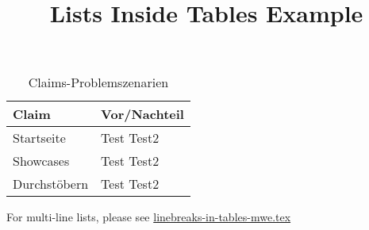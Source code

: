 \documentclass[11pt,a4paper]{scrartcl}
\title{Lists Inside Tables Example}
\begin{document}
\makeatletter
{\LARGE \textbf{\@title}}
\makeatother
\vspace{2.5em}


\begin{table}[ht]\centering
    \begin{tabular}{ll}
        Claim           & Vor/Nachteil                      \\\midrule
        Startseite      & \tabitem{} Test \tabitem{} Test2  \\\addlinespace
        Showcases       & \tabitem{} Test \tabitem{} Test2  \\\addlinespace
        Durchstöbern    & \tabitem{} Test \tabitem{} Test2  \\
    \end{tabular}
    \caption{Claims-Problemszenarien}\label{tab:claims-problemszenarien}
\end{table}

For multi-line lists, please see \href{https://github.com/mzietlow/latex-extensions/blob/master/tables/linebreaks-in-tables/linebreaks-in-tables-mwe.tex}{linebreaks-in-tables-mwe.tex}
\end{document}

